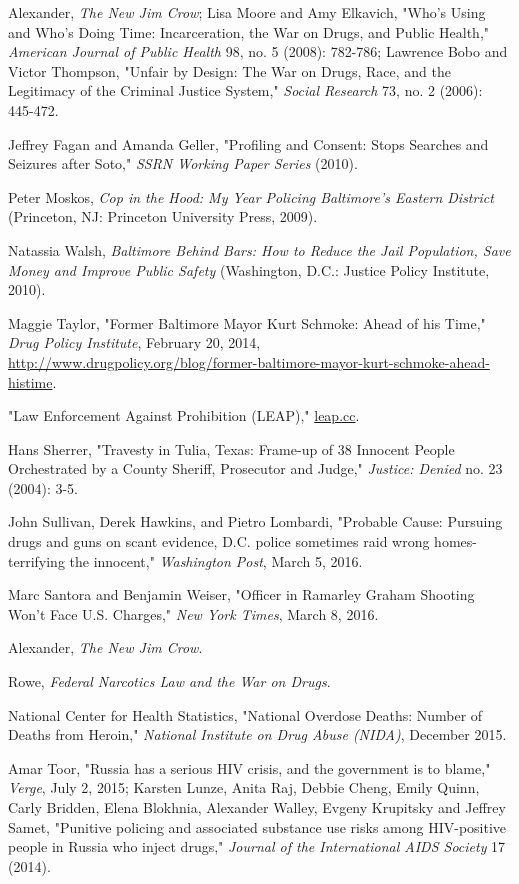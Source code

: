 \documentclass[fontset=fandol, a4paper, 12pt, openright]{ctexbook}
\begin{document}
\begin{enumerate}[label={[\arabic*]}]
    \item Alexander, \textit{The New Jim Crow}; Lisa Moore and Amy Elkavich, "Who's Using and Who's Doing Time: Incarceration, the War on Drugs, and Public Health," \textit{American Journal of Public Health} 98, no. 5 (2008): 782-786; Lawrence Bobo and Victor Thompson, "Unfair by Design: The War on Drugs, Race, and the Legitimacy of the Criminal Justice System," \textit{Social Research} 73, no. 2 (2006): 445-472.
    \item Jeffrey Fagan and Amanda Geller, "Profiling and Consent: Stops Searches and Seizures after Soto," \textit{SSRN Working Paper Series} (2010).
    \item Peter Moskos, \textit{Cop in the Hood: My Year Policing Baltimore's Eastern District} (Princeton, NJ: Princeton University Press, 2009).
    \item Natassia Walsh, \textit{Baltimore Behind Bars: How to Reduce the Jail Population, Save Money and Improve Public Safety} (Washington, D.C.: Justice Policy Institute, 2010).
    \item Maggie Taylor, "Former Baltimore Mayor Kurt Schmoke: Ahead of his Time," \textit{Drug Policy Institute}, February 20, 2014, \url{http://www.drugpolicy.org/blog/former-baltimore-mayor-kurt-schmoke-ahead-histime}.
    \item "Law Enforcement Against Prohibition (LEAP)," \url{leap.cc}.
    \item Hans Sherrer, "Travesty in Tulia, Texas: Frame-up of 38 Innocent People Orchestrated by a County Sheriff, Prosecutor and Judge," \textit{Justice: Denied} no. 23 (2004): 3-5.
    \item John Sullivan, Derek Hawkins, and Pietro Lombardi, "Probable Cause: Pursuing drugs and guns on scant evidence, D.C. police sometimes raid wrong homes-terrifying the innocent," \textit{Washington Post}, March 5, 2016.
    \item Marc Santora and Benjamin Weiser, "Officer in Ramarley Graham Shooting Won't Face U.S. Charges," \textit{New York Times}, March 8, 2016.
    \item Alexander, \textit{The New Jim Crow}.
    \item Rowe, \textit{Federal Narcotics Law and the War on Drugs}.
    \item National Center for Health Statistics, "National Overdose Deaths: Number of Deaths from Heroin," \textit{National Institute on Drug Abuse (NIDA)}, December 2015.
    \item Amar Toor, "Russia has a serious HIV crisis, and the government is to blame," \textit{Verge}, July 2, 2015; Karsten Lunze, Anita Raj, Debbie Cheng, Emily Quinn, Carly Bridden, Elena Blokhnia, Alexander Walley, Evgeny Krupitsky and Jeffrey Samet, "Punitive policing and associated substance use risks among HIV-positive people in Russia who inject drugs," \textit{Journal of the International AIDS Society} 17 (2014).

\end{enumerate}
\end{document}
